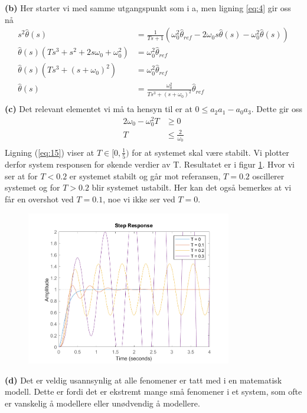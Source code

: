 \documentclass[11pt, a4paper, norsk]{rapport1} %
\begin{document}
\textbf{(b)} Her starter vi med samme utgangspunkt som i a, men ligning \ref{eq:4} gir oss nå
\begin{equation}
    \begin{aligned}
        s^2\hat{\theta}(s) &= \frac{1}{Ts+1}(\omega_0^2\hat{\theta}_{ref} - 2\omega_0s\hat{\theta}(s) - \omega_0^2\hat{\theta}(s)) \\
        \hat{\theta}(s)(Ts^3 + s^2 + 2s\omega_0 + \omega_0^2) &= \omega_0^2\hat{\theta}_{ref} \\
        \hat{\theta}(s)(Ts^3 + (s+\omega_0)^2) &= \omega_0^2\hat{\theta}_{ref} \\
        \hat{\theta}(s) &= \frac{\omega_0^2}{Ts^3 + (s+\omega_0)^2} \hat{\theta}_{ref} \\
    \end{aligned}
    \label{eq:14}
\end{equation}
\textbf{(c)} Det relevant elementet vi må ta hensyn til er at $0 \le a_2a_1-a_0a_3 $. Dette gir oss
\begin{equation}
    \begin{aligned}
        2\omega_0 - \omega_0^2T  &\ge 0\\
        T &\le \frac{2}{\omega_0} \\
    \end{aligned}
    \label{eq:15}
\end{equation}
Ligning (\ref{eq:15}) viser at $T \in [0, \frac{1}{5})$ for at systemet skal være stabilt. 
Vi plotter derfor system responsen for økende verdier av T. Resultatet er i figur \ref{fig:3}.
Hvor vi ser at for $T < 0.2$ er systemet stabilt og går mot referansen, $T = 0.2$ oscillerer systemet og for $T > 0.2$ 
blir systemet ustabilt. Her kan det også bemerkes at vi får en overshot ved $T=0.1$, noe vi ikke ser ved $T=0$.
\begin{figure}
    \centering
    \includegraphics[width=0.8\textwidth]{figures/oppg2_respons.png}
    \label{fig:3}
\end{figure}
\newline
\textbf{(d)} Det er veldig usannsynlig at alle fenomener er tatt med i en matematisk modell.
Dette er fordi det er ekstremt mange små fenomener i et system, som ofte er vanskelig å modellere eller unødvendig å modellere.
\newpage
\end{document}
